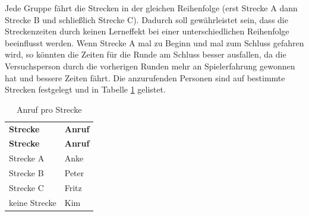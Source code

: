 \documentclass[12pt,a4paper]{scrartcl}
\begin{document}
Jede Gruppe fährt die Strecken in der gleichen Reihenfolge (erst Strecke A dann Strecke B und schließlich Strecke C). Dadurch soll gewährleistet sein, dass die Streckenzeiten durch keinen Lerneffekt bei einer unterschiedlichen Reihenfolge beeinflusst werden. Wenn Strecke A mal zu Beginn und mal zum Schluss gefahren wird, so könnten die Zeiten für die Runde am Schluss besser ausfallen, da die Versuchsperson durch die vorherigen Runden mehr an Spielerfahrung gewonnen hat und bessere Zeiten fährt. Die anzurufenden Personen sind auf bestimmte Strecken festgelegt und in Tabelle \ref{anrufstrecke1} gelistet. 

\begin{longtable}{p{6cm}p{6cm}}
	\label{anrufstrecke1}\\
	\caption[Anruf pro Strecke]{Anruf pro Strecke}\\
	\hline
	\textbf{Strecke} &	\textbf{Anruf}\\
	\hline
	\endfirsthead
	\hline
	\textbf{Strecke} &	\textbf{Anruf}\\
	\hline
	\endhead
Strecke A & Anke\\
Strecke B & Peter\\
Strecke C & Fritz\\
keine Strecke & Kim\\


\hline
\end{longtable}
\end{document}

